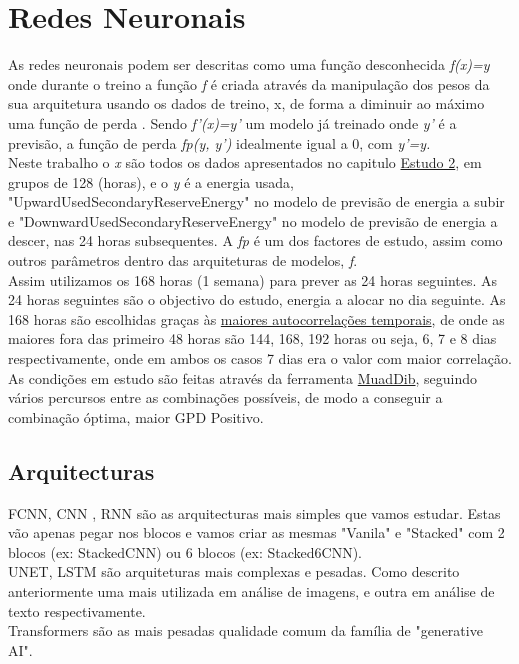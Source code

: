 \section{Redes Neuronais}

As redes neuronais podem ser descritas como uma função desconhecida \textit{f(x)=y} onde durante o treino a função \textit{f} é criada através da manipulação dos pesos da sua arquitetura usando os dados de treino, x, de forma a diminuir ao máximo uma função de perda . Sendo \textit{f'(x)=y'} um modelo já treinado onde \textit{y'} é a previsão, a função de perda \textit{fp(y, y')} idealmente igual a 0, com \textit{y'=y.}\\
Neste trabalho o \textit{x} são todos os dados apresentados no capitulo \hyperref[ch:estudo_2]{Estudo 2}, em grupos de 128 (horas), e o \textit{y} é a energia usada, "UpwardUsedSecondaryReserveEnergy" no modelo de previsão de energia a subir e "DownwardUsedSecondaryReserveEnergy" no modelo de previsão de energia a descer, nas 24 horas subsequentes. A \textit{fp} é um dos factores de estudo, assim como outros parâmetros dentro das arquiteturas de modelos, \textit{f}.\\
Assim utilizamos os 168 horas (1 semana) para prever as 24 horas seguintes. As 24 horas seguintes são o objectivo do estudo, energia a alocar no dia seguinte. As 168 horas são escolhidas graças às \hyperref[tab:tempcorr]{maiores autocorrelações temporais}, de onde as maiores fora das primeiro 48 horas são 144, 168, 192 horas ou seja, 6, 7 e 8 dias respectivamente, onde em ambos os casos 7 dias era o valor com maior correlação.\\
As condições em estudo são feitas através da ferramenta \hyperref[se:muaddib]{MuadDib}, seguindo vários percursos entre as combinações possíveis, de modo a conseguir a combinação óptima, maior GPD Positivo.\\


\subsection{Arquitecturas}

\gls{FCNN}, \gls{CNN} , RNN são as arquitecturas mais simples que vamos estudar. Estas vão apenas pegar nos blocos e vamos criar as mesmas "Vanila" e "Stacked" com 2 blocos (ex: StackedCNN) ou 6 blocos (ex: Stacked6CNN).\\
UNET, \gls{LSTM} são arquiteturas mais complexas e pesadas. Como descrito anteriormente uma mais utilizada em análise de imagens, e outra em análise de texto respectivamente.\\
Transformers são as mais pesadas qualidade comum da família de "generative AI".

